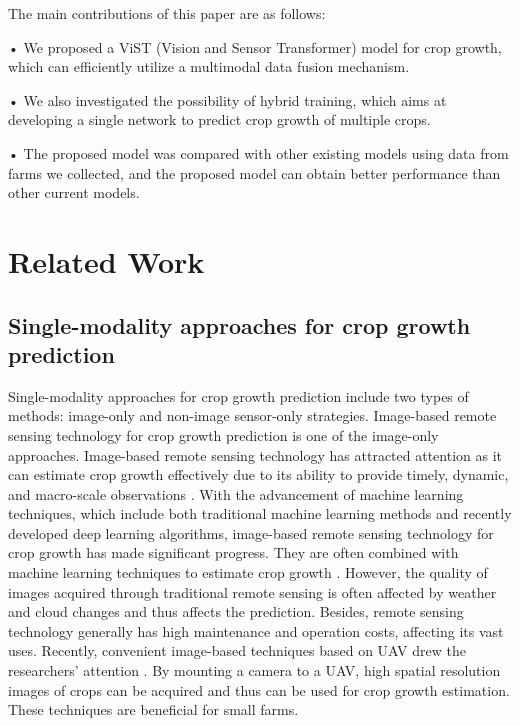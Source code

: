 \documentclass[acmsmall, screen]{acmart}
\begin{document}
The main contributions of this paper are as follows:

•	We proposed a ViST (Vision and Sensor Transformer) model for crop growth, which can efficiently utilize a multimodal data fusion mechanism. 

•	We also investigated the possibility of hybrid training, which aims at developing a single network to predict crop growth of multiple crops.  

•	The proposed model was compared with other existing models using data from farms we collected, and the proposed model can obtain better performance than other current models.





\section{Related Work}
\subsection{Single-modality approaches for crop growth prediction}
Single-modality approaches for crop growth prediction include two types of methods: image-only and non-image sensor-only strategies. Image-based remote sensing technology for crop growth prediction is one of the image-only approaches. Image-based remote sensing technology has attracted attention as it can estimate crop growth effectively due to its ability to provide timely, dynamic, and macro-scale observations \cite{__2016}. With the advancement of machine learning techniques, which include both traditional machine learning methods\cite{Xu_field_2008, Tang_field_2011} and recently developed deep learning algorithms\cite{Chen_field_2022}, image-based remote sensing technology for crop growth has made significant progress. They are often combined with machine learning techniques to estimate crop growth \cite{johnson_crop_2016,zhong_deep_2019,yang_deep_2019}. However, the quality of images acquired through traditional remote sensing is often affected by weather and cloud changes and thus affects the prediction. Besides, remote sensing technology generally has high maintenance and operation costs, affecting its vast uses. Recently, convenient image-based techniques based on UAV drew the researchers’ attention \cite{weiss_plant_2011,tao_estimation_2020,zhou_predicting_2017,maimaitijiang_unmanned_2017,wan_grain_2020}. By mounting a camera to a UAV, high spatial resolution images of crops can be acquired and thus can be used for crop growth estimation. These techniques are beneficial for small farms.
\end{document}
